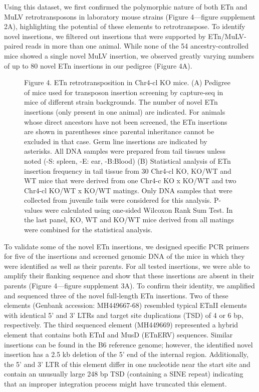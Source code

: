 \documentclass[11pt,a4paper]{article}
\begin{document}
Using this dataset, we first confirmed the polymorphic nature of both ETn and MuLV retrotransposons in laboratory mouse strains (Figure 4—figure supplement 2A), highlighting the potential of these elements to retrotranspose. To identify novel insertions, we filtered out insertions that were supported by ETn/MuLV-paired reads in more than one animal. While none of the 54 ancestry-controlled mice showed a single novel MuLV insertion, we observed greatly varying numbers of up to 80 novel ETn insertions in our pedigree (Figure 4A).

\begin{figure}[h]
\caption{Figure 4. ETn retrotransposition in Chr4-cl KO mice. (A) Pedigree of mice used for transposon insertion screening by capture-seq in mice of different strain backgrounds. The number of novel ETn insertions (only present in one animal) are indicated. For animals whose direct ancestors have not been screened, the ETn insertions are shown in parentheses since parental inheritance cannot be excluded in that case. Germ line insertions are indicated by asterisks. All DNA samples were prepared from tail tissues unless noted (-S: spleen, -E: ear, -B:Blood) (B) Statistical analysis of ETn insertion frequency in tail tissue from 30 Chr4-cl KO, KO/WT and WT mice that were derived from one Chr4-c KO x KO/WT and two Chr4-cl KO/WT x KO/WT matings. Only DNA samples that were collected from juvenile tails were considered for this analysis. P-values were calculated using one-sided Wilcoxon Rank Sum Test. In the last panel, KO, WT and KO/WT mice derived from all matings were combined for the statistical analysis.}
\end{figure}

To validate some of the novel ETn insertions, we designed specific PCR primers for five of the insertions and screened genomic DNA of the mice in which they were identified as well as their parents. For all tested insertions, we were able to amplify their flanking sequence and show that these insertions are absent in their parents (Figure 4—figure supplement 3A). To confirm their identity, we amplified and sequenced three of the novel full-length ETn insertions. Two of these elements (Genbank accession: MH449667-68) resembled typical ETnII elements with identical 5’ and 3’ LTRs and target site duplications (TSD) of 4 or 6 bp, respectively. The third sequenced element (MH449669) represented a hybrid element that contains both ETnI and MusD (ETnERV) sequences. Similar insertions can be found in the B6 reference genome; however, the identified novel insertion has a 2.5 kb deletion of the 5’ end of the internal region. Additionally, the 5’ and 3’ LTR of this element differ in one nucleotide near the start site and contain an unusually large 248 bp TSD (containing a SINE repeat) indicating that an improper integration process might have truncated this element.
\end{document}
